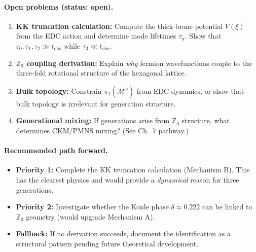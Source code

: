 \paragraph{Open problems (status: open).}
\begin{enumerate}
    \item \textbf{KK truncation calculation:} Compute the thick-brane potential
          $V(\xi)$ from the EDC action and determine mode lifetimes $\tau_n$.
          Show that $\tau_0, \tau_1, \tau_2 \gg t_{\text{obs}}$ while
          $\tau_3 \ll t_{\text{obs}}$.

    \item \textbf{$\mathbb{Z}_3$ coupling derivation:} Explain \emph{why}
          fermion wavefunctions couple to the three-fold rotational structure
          of the hexagonal lattice.

    \item \textbf{Bulk topology:} Constrain $\pi_1(\mathcal{M}^5)$ from EDC dynamics,
          or show that bulk topology is irrelevant for generation structure.

    \item \textbf{Generational mixing:} If generations arise from $\mathbb{Z}_3$
          structure, what determines CKM/PMNS mixing? (See Ch.~7 pathway.)
\end{enumerate}

\paragraph{Recommended path forward.}
\begin{itemize}[nosep]
    \item \textbf{Priority 1:} Complete the KK truncation calculation (Mechanism B).
          This has the clearest physics and would provide a \emph{dynamical} reason
          for three generations.
    \item \textbf{Priority 2:} Investigate whether the Koide phase $\delta \approx 0.222$
          can be linked to $\mathbb{Z}_3$ geometry (would upgrade Mechanism A).
    \item \textbf{Fallback:} If no derivation succeeds, document the identification
          \tagI{} as a structural pattern pending future theoretical development.
\end{itemize}


